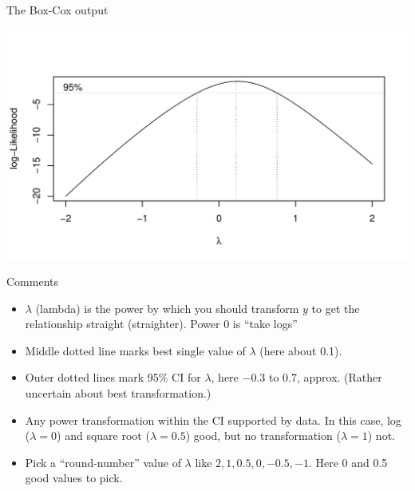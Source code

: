 \documentclass[unknownkeysallowed]{beamer}\usepackage[]{graphicx}\usepackage[]{color}
\makeatletter
\def\maxwidth{ %
  \ifdim\Gin@nat@width>\linewidth
    \linewidth
  \else
    \Gin@nat@width
  \fi
}
\newenvironment{knitrout}{}{} %
\makeatother
\begin{document}
\begin{frame}[fragile]{The Box-Cox output}
  
 
\begin{knitrout}
\color{fgcolor}
\includegraphics[width=\maxwidth]{figure/trento-1} 

\end{knitrout}
  
  
\end{frame}

\begin{frame}[fragile]{Comments}
  \begin{itemize}
  \item $\lambda$ (lambda) is the power by which you should transform
    $y$ to get the relationship straight (straighter). Power 0 is
    ``take logs''
  \item Middle dotted line marks best single value of $\lambda$ (here
    about 0.1).
  \item Outer dotted lines mark 95\% CI for $\lambda$, here $-0.3$ to
    0.7, approx. (Rather uncertain about best transformation.)
  \item Any power transformation within the CI supported by data. In
    this case, log ($\lambda=0$) and square root ($\lambda=0.5$) good,
    but no transformation ($\lambda=1$)  not.
  \item Pick a ``round-number'' value of $\lambda$ like
    $2,1,0.5,0,-0.5,-1$. Here 0 and 0.5 good values to pick. 
  \end{itemize}
\end{frame}
\end{document}

